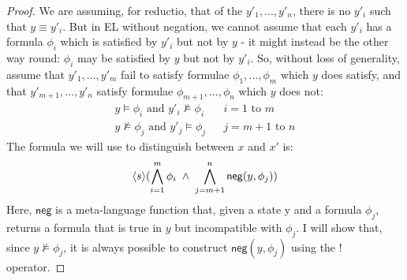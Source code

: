\begin{proof}
We are assuming, for reductio, that of the $y'_1, ..., y'_n$, there is no $y'_i$ such that $y \equiv y'_i$.
But in EL without negation, we cannot assume that each $y'_i$ has a formula $\phi_i$ which is satisfied by $y'_i$ but not by $y$ - it might instead be the other way round: $\phi_i$ may be satisfied by $y$ but not by $y'_i$. So, without loss of generality, assume that $y'_1, ..., y'_m$ fail to satisfy formulae $\phi_1, ..., \phi_m$ which $y$ does satisfy, and that $y'_{m+1}, ..., y'_n$ satisfy formulae $\phi_{m+1}, ..., \phi_n$ which $y$ does not:
\begin{eqnarray*}
y \models \phi_i \mbox{ and } y'_i \nvDash \phi_i & & i = 1 \mbox{ to } m  \\
y \nvDash \phi_j \mbox{ and } y'_j \models \phi_j & & j = m+1 \mbox{ to } n 
\end{eqnarray*}
The formula we will use to distinguish between $x$ and $x'$ is:
\[
 \langle s \rangle ( \bigwedge_{i=1}^m \phi_i \; \land \; \bigwedge_{j=m+1}^n \mathsf{neg}(y, \phi_j))
 \]
 Here, $\mathsf{neg}$ is a meta-language function that, given a state y and a formula $\phi_j$, returns a formula that is true in $y$ but incompatible with $\phi_j$. I will show that, since $y \nvDash \phi_j$, it is always possible to construct $ \mathsf{neg}(y, \phi_j)$ using the $!$ operator.


\end{proof}

